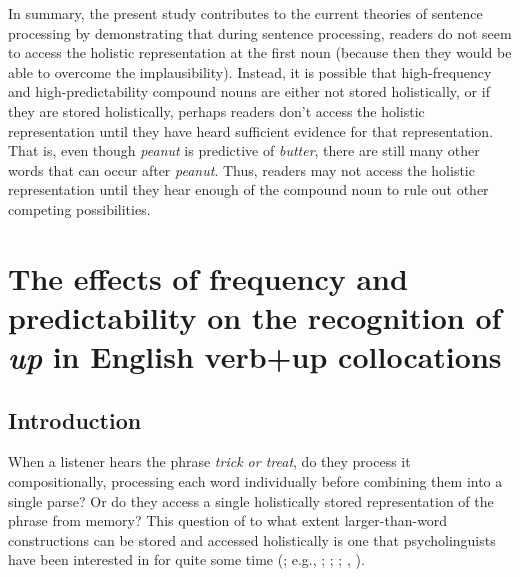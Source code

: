 \documentclass[
  12pt,
  letterpaper,
]{scrreport}
\begin{document}
In summary, the present study contributes to the current theories of
sentence processing by demonstrating that during sentence processing,
readers do not seem to access the holistic representation at the first
noun (because then they would be able to overcome the implausibility).
Instead, it is possible that high-frequency and high-predictability
compound nouns are either not stored holistically, or if they are stored
holistically, perhaps readers don't access the holistic representation
until they have heard sufficient evidence for that representation. That
is, even though \emph{peanut} is predictive of \emph{butter}, there are
still many other words that can occur after \emph{peanut}. Thus, readers
may not access the holistic representation until they hear enough of the
compound noun to rule out other competing possibilities.


\chapter{\texorpdfstring{The effects of frequency and predictability on
the recognition of \emph{up} in English verb+up
collocations}{The effects of frequency and predictability on the recognition of up in English verb+up collocations}}\label{the-effects-of-frequency-and-predictability-on-the-recognition-of-up-in-english-verbup-collocations}

\section{Introduction}\label{introduction-2}

When a listener hears the phrase \emph{trick or treat}, do they process
it compositionally, processing each word individually before combining
them into a single parse? Or do they access a single holistically stored
representation of the phrase from memory? This question of to what
extent larger-than-word constructions can be stored and accessed
holistically is one that psycholinguists have been interested in for
quite some time (; e.g.,
;
;
; ,
).
\end{document}
